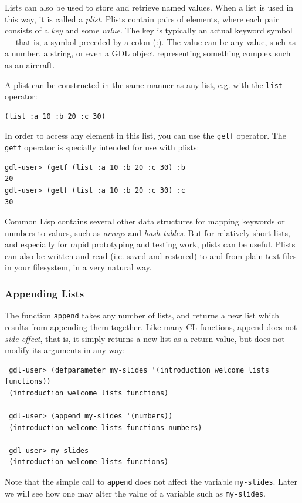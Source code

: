 \documentclass [11pt]{book}
\begin{document}
\label{subsubsec:usingalisttostoreandretrievenamedvalues}

Lists can also be used to store and retrieve named values. When a list is used in this way, 
it is called a \emph{plist}. Plists contain pairs of elements, where each pair consists of a \emph{key} and some \emph{value}. The key is typically an actual keyword symbol --- that is,
a symbol preceded by a colon (:). The value can be any value, such as
a number, a string, or even a GDL object representing something
complex such as an aircraft.

A plist can be constructed in the same manner as any list, e.g. with the \texttt{list} operator:

\begin{verbatim}(list :a 10 :b 20 :c 30)
\end{verbatim}In order to access any element in this list, you can use the \texttt{getf} operator. The \texttt{getf} operator is specially intended for use with plists:

\begin{verbatim}gdl-user> (getf (list :a 10 :b 20 :c 30) :b
20
gdl-user> (getf (list :a 10 :b 20 :c 30) :c
30
\end{verbatim} Common Lisp contains several other data structures for mapping keywords or numbers to values, such
as \emph{arrays} and \emph{hash tables}. But for relatively short lists, and especially for rapid prototyping and testing work, plists
can be useful. Plists can also be written and read (i.e. saved and restored) to and from plain text files
in your filesystem, in a very natural way.

\subsubsection{Appending Lists}

\label{subsubsec:appendinglists}

The function \texttt{append} takes any number of lists, and returns a new list which results from
appending them together. Like many CL functions, append does not \emph{side-effect}, that is, it simply returns a new list as a return-value, but does not modify its 
arguments in any way:

\begin{verbatim}
 gdl-user> (defparameter my-slides '(introduction welcome lists functions))
 (introduction welcome lists functions)

 gdl-user> (append my-slides '(numbers))
 (introduction welcome lists functions numbers)

 gdl-user> my-slides
 (introduction welcome lists functions)
\end{verbatim}Note that the simple call to \texttt{append} does not affect the variable \texttt{my-slides}. Later we will see how one may alter the value of a variable such as \texttt{my-slides}.
\end{document}
